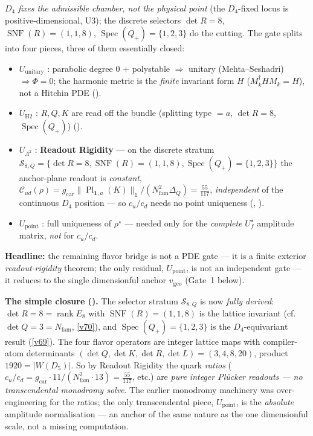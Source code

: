 \documentclass[11pt,a4paper]{article}
\newcommand{\Nfam}{N_{\mathrm{fam}}}
\newcommand{\gcar}{g_{\mathrm{car}}}
\begin{document}
\begin{keybox}
$D_4$ \emph{fixes the admissible chamber, not the physical point} (the $D_4$-fixed locus is
positive-dimensional, U3); the discrete selectors $\det R=8$, $\operatorname{SNF}(R)=(1,1,8)$,
$\operatorname{Spec}(Q_+)=\{1,2,3\}$ do the cutting. The gate splits into four pieces, three of them
essentially closed:
\begin{itemize}
\item $U_{\mathrm{unitary}}$ \mE: parabolic degree $0$ $+$ polystable $\Rightarrow$ unitary (Mehta--Seshadri)
  $\Rightarrow\Phi=0$; the harmonic metric is the \emph{finite} invariant form $H$ ($M_k^\dagger HM_k=H$),
  not a Hitchin PDE ().
\item $U_{\mathrm{H2}}$ \mE: $R,Q,K$ are read off the bundle (splitting type $=a$, $\det R=8$,
  $\operatorname{Spec}(Q_+)$) ().
\item $U_{\Lambda^2}$ \mE: \textbf{Readout Rigidity} --- on the discrete stratum
  $\mathcal S_{8,Q}=\{\det R=8,\operatorname{SNF}(R)=(1,1,8),\operatorname{Spec}(Q_+)=\{1,2,3\}\}$ the
  anchor-plane readout is \emph{constant},
  $\mathcal C_{ud}(\rho)=\gcar\|\operatorname{Pl}_{\mathbf1,a}(K)\|_1/(\Nfam^2\Delta_Q)=\tfrac{55}{117}$,
  \emph{independent} of the continuous $D_4$ position --- so $c_u/c_d$ needs no point uniqueness
  (, ).
\item $U_{\mathrm{point}}$ \mO: full uniqueness of $\rho^\star$ --- needed only for the \emph{complete}
  $U_f^\star$ amplitude matrix, \emph{not} for $c_u/c_d$.
\end{itemize}
\textbf{Headline:} the remaining flavor bridge is not a PDE gate --- it is a finite exterior
\emph{readout-rigidity} theorem; the only residual, $U_{\mathrm{point}}$, is not an independent gate ---
it reduces to the single dimensionful anchor $v_{\mathrm{geo}}$ (Gate~1 below).

\smallskip\noindent\textbf{The simple closure ().} The selector stratum
$\mathcal S_{8,Q}$ is now \emph{fully derived}: $\det R=8=\operatorname{rank}E_8$ with $\operatorname{SNF}(R)=(1,1,8)$
is the lattice invariant (cf.\ $\det Q=3=\Nfam$, \vref{v70}), and $\operatorname{Spec}(Q_+)=\{1,2,3\}$ is the
$D_4$-equivariant result (\vref{v69}). The four flavor operators are integer lattice maps with compiler-atom
determinants $(\det Q,\det K,\det R,\det L)=(3,4,8,20)$, product $1920=|W(D_5)|$. So by Readout Rigidity the
quark \emph{ratios} ($c_u/c_d=g_{\mathrm{car}}\!\cdot\!11/(\Nfam^2\!\cdot\!13)=\tfrac{55}{117}$, etc.) are
\emph{pure integer Pl\"ucker readouts --- no transcendental monodromy solve}. The earlier monodromy
machinery was over-engineering for the ratios; the only transcendental piece, $U_{\mathrm{point}}$, is the
\emph{absolute} amplitude normalisation --- an anchor of the same nature as the one dimensionful scale, not
a missing computation.


\end{keybox}
\end{document}
